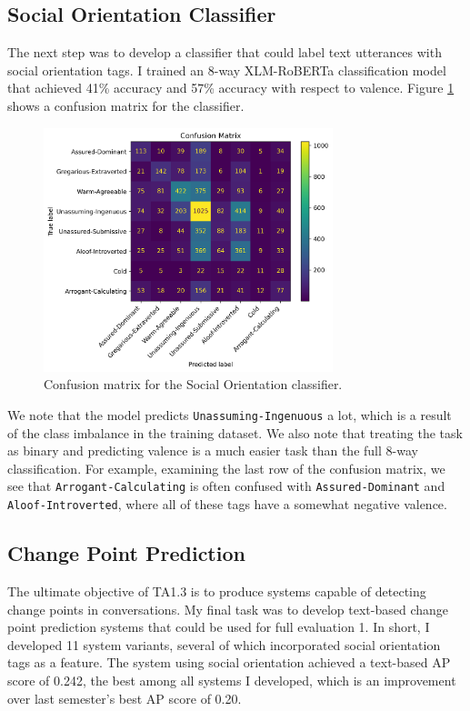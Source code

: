 \documentclass[12pt]{article}
\begin{document}
\subsection{Social Orientation Classifier}
The next step was to develop a classifier that could label text utterances with social orientation tags. I trained an 8-way  XLM-RoBERTa classification model \cite{xlmr} that achieved 41\% accuracy and 57\% accuracy with respect to valence. Figure \ref{fig:confusion_matrix} shows a confusion matrix for the classifier.

\begin{figure}[H]
    \centering
    \includegraphics[width=0.75\textwidth]{./analysis/confusion.png}
    \caption{Confusion matrix for the Social Orientation classifier.}
    \label{fig:confusion_matrix}
\end{figure}

We note that the model predicts \verb|Unassuming-Ingenuous| a lot, which is a result of the class imbalance in the training dataset. We also note that treating the task as binary and predicting valence is a much easier task than the full 8-way classification. For example, examining the last row of the confusion matrix, we see that \verb|Arrogant-Calculating| is often confused with \verb|Assured-Dominant| and \verb|Aloof-Introverted|, where all of these tags have a somewhat negative valence.

\subsection{Change Point Prediction}
The ultimate objective of TA1.3 is to produce systems capable of detecting change points in conversations. My final task was to develop text-based change point prediction systems that could be used for full evaluation 1. In short, I developed 11 system variants, several of which incorporated social orientation tags as a feature. The system using social orientation achieved a text-based AP score of 0.242, the best among all systems I developed, which is an improvement over last semester's best AP score of 0.20.
\end{document}
